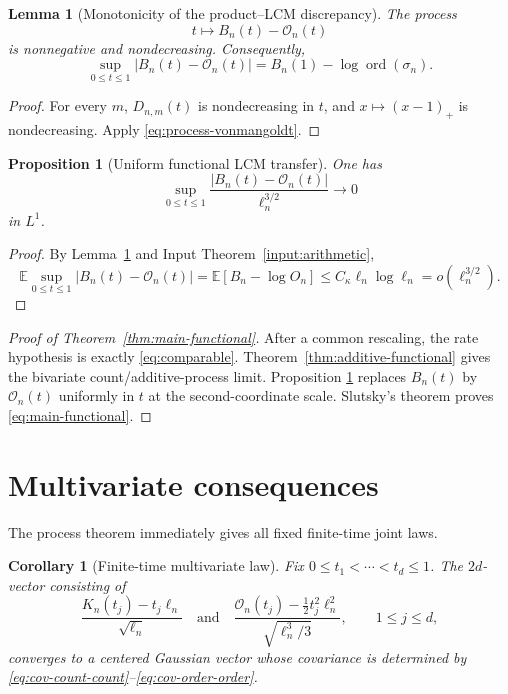 \documentclass[11pt]{article}
\newtheorem{proposition}[theorem]{Proposition}
\newtheorem{lemma}[theorem]{Lemma}
\newtheorem{corollary}[theorem]{Corollary}
\theoremstyle{definition}
\theoremstyle{remark}
\newcommand{\Ee}{\mathbb E}
\newcommand{\ord}{\operatorname{ord}}
\newcommand{\cO}{\mathcal O}
\begin{document}
\begin{lemma}[Monotonicity of the product--LCM discrepancy]
\label{lem:monotone-discrepancy}
The process
\[
 t\longmapsto B_n(t)-\cO_n(t)
\]
is nonnegative and nondecreasing.  Consequently,
\begin{equation}\label{eq:sup-discrepancy}
 \sup_{0\le t\le1}|B_n(t)-\cO_n(t)|
 =B_n(1)-\log\ord(\sigma_n).
\end{equation}
\end{lemma}

\begin{proof}
For every $m$, $D_{n,m}(t)$ is nondecreasing in $t$, and
$x\mapsto(x-1)_+$ is nondecreasing.  Apply
\eqref{eq:process-vonmangoldt}.
\end{proof}

\begin{proposition}[Uniform functional LCM transfer]
\label{prop:functional-LCM-transfer}
One has
\begin{equation}\label{eq:functional-LCM-transfer}
 \sup_{0\le t\le1}
 \frac{|B_n(t)-\cO_n(t)|}{\ell_n^{3/2}}
 \longrightarrow0
\end{equation}
in $L^1$.
\end{proposition}

\begin{proof}
By Lemma~\ref{lem:monotone-discrepancy} and
Input Theorem~\ref{input:arithmetic},
\[
 \Ee\sup_{0\le t\le1}|B_n(t)-\cO_n(t)|
 =\Ee[B_n-\log O_n]
 \le C_\kappa\ell_n\log\ell_n
 =o(\ell_n^{3/2}).
\]
\end{proof}

\begin{proof}[Proof of Theorem~\ref{thm:main-functional}]
After a common rescaling, the rate hypothesis is exactly
\eqref{eq:comparable}.  Theorem~\ref{thm:additive-functional} gives the
bivariate count/additive-process limit.  Proposition
\ref{prop:functional-LCM-transfer} replaces $B_n(t)$ by $\cO_n(t)$ uniformly
in $t$ at the second-coordinate scale.  Slutsky's theorem proves
\eqref{eq:main-functional}.
\end{proof}

\section{Multivariate consequences}

The process theorem immediately gives all fixed finite-time joint laws.

\begin{corollary}[Finite-time multivariate law]
\label{cor:finite-time}
Fix $0\le t_1<\cdots<t_d\le1$.  The $2d$-vector consisting of
\[
 \frac{K_n(t_j)-t_j\ell_n}{\sqrt{\ell_n}}
 \quad\text{and}\quad
 \frac{\cO_n(t_j)-\frac12t_j^2\ell_n^2}
      {\sqrt{\ell_n^3/3}},
 \qquad 1\le j\le d,
\]
converges to a centered Gaussian vector whose covariance is determined by
\eqref{eq:cov-count-count}--\eqref{eq:cov-order-order}.
\end{corollary}
\end{document}
